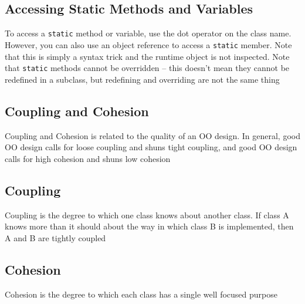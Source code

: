 \subsection{Accessing Static Methods and Variables}
To access a \verb#static# method or variable, use the dot operator on the class 
name. However, you can also use an object reference to access a \verb#static#
member. Note that this is simply a syntax trick and the runtime object is not 
inspected. Note that \verb#static# methods cannot be overridden -- this doesn't 
mean they cannot be redefined in a subclass, but redefining and overriding are 
not the same thing

\subsection{Coupling and Cohesion}
Coupling and Cohesion is related to the quality of an OO design. In general, 
good OO design calls for loose coupling and shuns tight coupling, and good OO 
design calls for high cohesion and shuns low cohesion

\subsection{Coupling}
Coupling is the degree to which one class knows about another class. If class A 
knows more than it should about the way in which class B is implemented, then A 
and B are tightly coupled

\subsection{Cohesion}
Cohesion is the degree to which each class has a single well focused purpose
